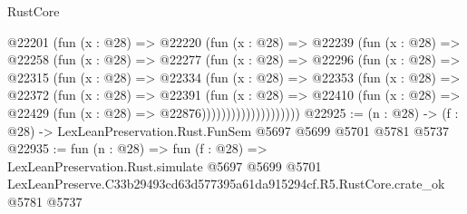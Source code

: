 \begin{lexlean}{RustCore}
\begin{coremodule}
                @22201
                  (fun (x : @28) =>
                  @22220
                    (fun (x : @28) =>
                    @22239
                      (fun (x : @28) =>
                      @22258
                        (fun (x : @28) =>
                        @22277
                          (fun (x : @28) =>
                          @22296
                            (fun (x : @28) =>
                            @22315
                              (fun (x : @28) =>
                              @22334
                                (fun (x : @28) =>
                                @22353
                                  (fun (x : @28) =>
                                  @22372
                                    (fun (x : @28) =>
                                    @22391
                                      (fun (x : @28) =>
                                      @22410
                                        (fun (x : @28) =>
                                        @22429 (fun (x : @28) => @22876))))))))))))))))))))
@22925 := (n : @28) -> (f : @28) -> LexLeanPreservation.Rust.FunSem @5697 @5699 @5701 @5781 @5737
@22935 := fun (n : @28) =>
  fun (f : @28) =>
  LexLeanPreservation.Rust.simulate
    @5697
    @5699
    @5701
    LexLeanPreserve.C33b29493cd63d577395a61da915294cf.R5.RustCore.crate_ok
    @5781
    @5737
\end{coremodule}
\end{lexlean}
